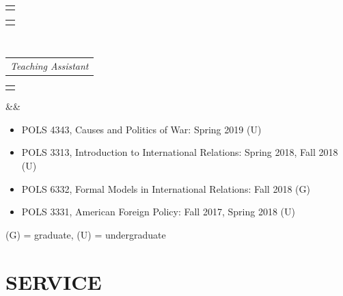 \documentclass[11pt,a4paper,roman]{moderncv}
\makeatletter
\newcommand*{\customcventry}[7][.25em]{%
  \begin{tabular}{@{}l}{\bfseries #4}\end{tabular}%
  \hfill%
  \begin{tabular}{l@{}}{\bfseries #5}\end{tabular}\\
  \begin{tabular}{@{}l}{\itshape #3}\end{tabular}%
  \hfill%
  \begin{tabular}{l@{}}{\itshape #2}\end{tabular}%
  \ifx&#7&%
  \else{\\%
    \begin{minipage}{\maincolumnwidth}\small#7\end{minipage}}\fi%
  \par\addvspace{#1}}
\makeatother
\begin{document}
\customcventry{}{Teaching Assistant}{}{}{}{}
\begin{itemize}
  \item POLS 4343, Causes and Politics of War: Spring 2019 (U)
  \item POLS 3313, Introduction to International Relations: Spring 2018, Fall 2018 (U)
  \item POLS 6332, Formal Models in International Relations: Fall 2018 (G)
  \item POLS 3331, American Foreign Policy: Fall 2017, Spring 2018 (U)
\end{itemize}

\vspace*{1mm}
\noindent\small{(G) = graduate, (U) = undergraduate}\normalsize

\section{SERVICE}
\end{document}
